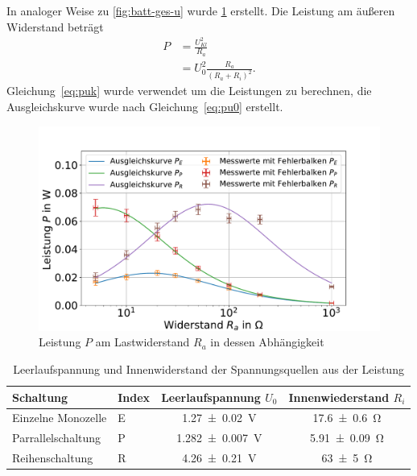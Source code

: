 \FloatBarrier


In analoger Weise zu \cref{fig:batt-ges-u} wurde \cref{fig:batt-ges-p} erstellt. Die Leistung am äußeren Widerstand beträgt 
\begin{align}
 P &=\frac{U_{Kl}^2}{R_a} \label{eq:puk}\\
 &= U_0^2 \frac{R_a}{(R_a+R_i)^2} \label{eq:pu0}.
\end{align} 
Gleichung~\ref{eq:puk} wurde verwendet um die Leistungen zu berechnen, die Ausgleichskurve wurde nach Gleichung~\ref{eq:pu0} erstellt.

\begin{figure}[h]
	\centering
	\includegraphics[width=0.9\linewidth]{"auswertung/Auswertung Innenwiderstand/Batterie Gesamt P"}
	\caption{Leistung $P$ am Lastwiderstand $R_a$ in dessen Abhängigkeit}
	\label{fig:batt-ges-p}
\end{figure}



\begin{table}
	\caption{Leerlaufspannung und Innenwiderstand der Spannungsquellen aus der Leistung}
	\centering
	\begin{tabular}{|l l||c|c|}
		\hline 
		Schaltung & Index	& Leerlaufspannung $U_0$ & Innenwiederstand $R_i$ \\ 
		\hline \hline
		Einzelne Monozelle	&E& \SI{1.27+-0.02}{V}  & \SI{17.6+-0.6}{\ohm } \\ 
		\hline  
		Parrallelschaltung	&P& \SI{1.282+-0.007}{V } &\SI{5.91+-0.09}{\ohm }  \\ 
		\hline   
		Reihenschaltung	&R& \SI{4.26+-0.21}{V } &\SI{63+-5}{\ohm }  \\ 
		\hline 
	\end{tabular} 
	
	\label{tab:batt-U-P}
	
\end{table}
